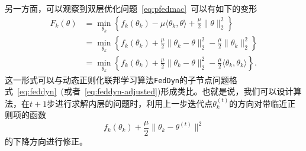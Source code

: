 另一方面，可以观察到双层优化问题~\eqref{eq:pfedmac}~可以有如下的变形
\begin{equation*}
\begin{aligned}
F_k(\theta) & = \min\limits_{\theta_k} \left\{ f_k(\theta_k) - \mu \langle \theta_k, \theta \rangle + \frac{\mu}{2} \lVert \theta \rVert^2_2 \right\} \\
& = \min\limits_{\theta_k} \left\{ f_k(\theta_k) + \frac{\mu}{2} \lVert \theta_k - \theta \rVert^2_2 - \frac{\mu}{2} \lVert \theta_k \rVert^2_2 \right\} \\
& = \min\limits_{\theta_k} \left\{ f_k(\theta_k) + \frac{\mu}{2} \lVert \theta_k - \theta \rVert^2_2 - \frac{\mu}{2} \langle \theta_k, \theta_k \rangle \right\}.
\end{aligned}
\end{equation*}
这一形式可以与动态正则化联邦学习算法\texttt{FedDyn}的子节点问题格式~\eqref{eq:feddyn}~(或者~\eqref{eq:feddyn-adjusted})形成类比。也就是说，我们可以设计算法，在$t+1$步进行求解内层的问题时，利用上一步迭代点$\theta_k^{(t)}$的方向对带临近正则项的函数
\begin{equation*}
f_k(\theta_k) + \frac{\mu}{2} \lVert \theta_k - \theta^{(t)} \rVert^2
\end{equation*}
的下降方向进行修正。

